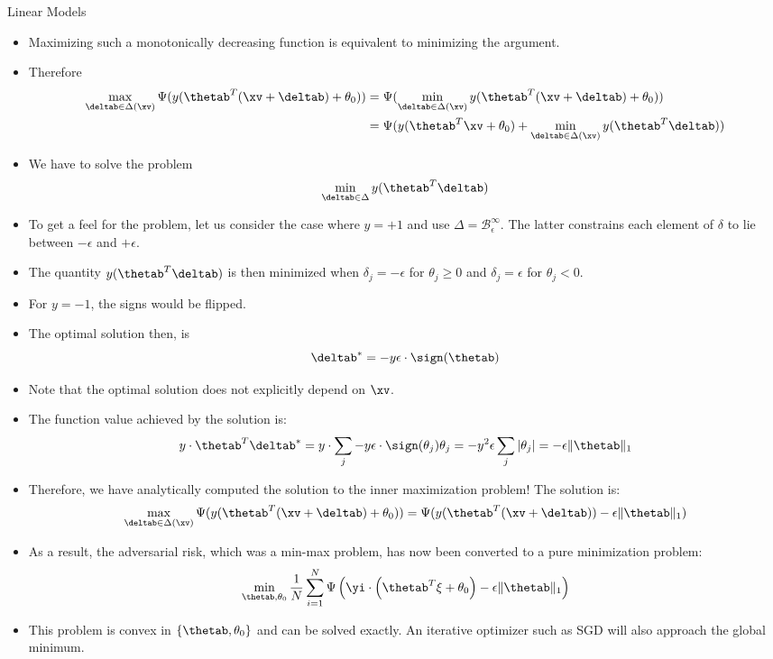 \begin{vbframe} {Linear Models}
\framebreak

  \begin{itemize}
    \item Maximizing such a monotonically decreasing function is equivalent to minimizing the argument.
    \lz
    \item Therefore
          \begin{align*}
            \max_{\deltab \in \Delta(\xv)} \Psi(y (\thetab^T(\xv + \deltab) + \theta_0)) &= \Psi(\min_{\deltab \in \Delta(\xv)}y (\thetab^T(\xv + \deltab) + \theta_0)) \\
                                                                                    &= \Psi (y (\thetab^T\xv + \theta_0) + \min_{\deltab \in \Delta(\xv)} y (\thetab^T \deltab))
          \end{align*}
    \lz
    \item We have to solve the problem
    $$ \min_{\deltab \in \Delta} y (\thetab^T \deltab) $$
  \end{itemize}

\framebreak

  \begin{itemize}
    \item To get a feel for the problem, let us consider the case where $y = +1$ and use $\Delta = \mathcal{B}^{\infty}_{\epsilon}$. The latter constrains each element of $\delta$ to lie between $-\epsilon$ and $+\epsilon$.
    \lz
    \item The quantity $y (\thetab^T \deltab)$ is then minimized when $\delta_j = - \epsilon$ for $\theta_{j} \geq 0$ and $\delta_j = \epsilon$ for $\theta_{j}<0$.
    \lz
    \item For $y = -1$, the signs would be flipped.
    \lz
    \item The optimal solution then, is
    $$\deltab^* = -y\epsilon \cdot \sign(\thetab) $$
    \item Note that the optimal solution does not explicitly depend on $\xv$. 

\framebreak

  \item The function value achieved by the solution is: 
  $$y \cdot \thetab^T \deltab^* = y \cdot \sum_j -y \epsilon \cdot \sign(\theta_j)\theta_j = - y^2 \epsilon \sum_j | \theta_j | = -\epsilon\|\thetab\|_{1} $$
  \item Therefore, we have analytically computed the solution to the inner maximization problem! The solution is:
  $$ \max_{\deltab \in \Delta(\xv)} \Psi(y (\thetab^T(\xv + \deltab) + \theta_0)) =  \Psi (y (\thetab^T(\xv + \deltab)) -\epsilon\|\thetab\|_{1}) $$
  \item As a result, the adversarial risk, which was a min-max problem, has now been converted to a pure minimization problem:
  $$\min_{\thetab, \theta_0} \frac{1}{N} \sum_{i = 1}^{N} \Psi \left(\yi \cdot\left(\thetab^{T} \xi +\theta_0\right)-\epsilon\|\thetab\|_{1}\right)$$
  \item This problem is convex in $\{\thetab, \theta_0\}$ and can be solved exactly. An iterative optimizer such as SGD will also approach the global minimum.
  \end{itemize}
  

\end{vbframe}
